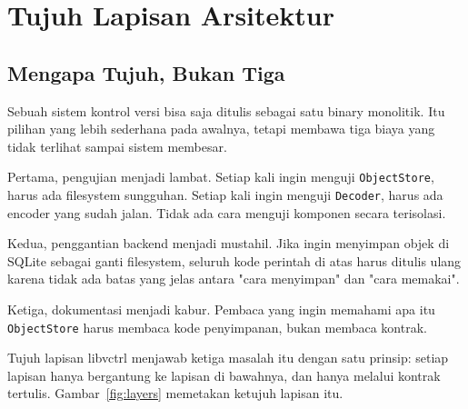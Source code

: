 \documentclass[11pt,a4paper]{article}
\begin{document}
\section{Tujuh Lapisan Arsitektur}

\subsection{Mengapa Tujuh, Bukan Tiga}

Sebuah sistem kontrol versi bisa saja ditulis sebagai satu binary monolitik. Itu pilihan yang lebih sederhana pada awalnya, tetapi membawa tiga biaya yang tidak terlihat sampai sistem membesar.

Pertama, pengujian menjadi lambat. Setiap kali ingin menguji \texttt{ObjectStore}, harus ada filesystem sungguhan. Setiap kali ingin menguji \texttt{Decoder}, harus ada encoder yang sudah jalan. Tidak ada cara menguji komponen secara terisolasi.

Kedua, penggantian backend menjadi mustahil. Jika ingin menyimpan objek di SQLite sebagai ganti filesystem, seluruh kode perintah di atas harus ditulis ulang karena tidak ada batas yang jelas antara "cara menyimpan" dan "cara memakai".

Ketiga, dokumentasi menjadi kabur. Pembaca yang ingin memahami apa itu \texttt{ObjectStore} harus membaca kode penyimpanan, bukan membaca kontrak.

Tujuh lapisan libvctrl menjawab ketiga masalah itu dengan satu prinsip: setiap lapisan hanya bergantung ke lapisan di bawahnya, dan hanya melalui kontrak tertulis. Gambar~\ref{fig:layers} memetakan ketujuh lapisan itu.
\end{document}
